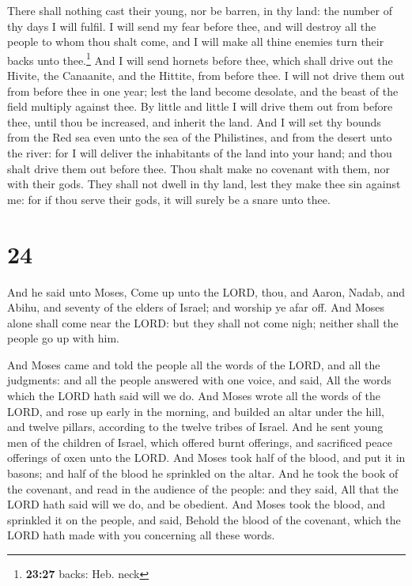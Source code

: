  There shall nothing cast their young, nor be barren, in
thy land: the number of thy days I will fulfil.  I will
send my fear before thee, and will destroy all the people to whom thou
shalt come, and I will make all thine enemies turn their backs unto
thee.\footnote{\textbf{23:27} backs: Heb. neck}  And I
will send hornets before thee, which shall drive out the Hivite, the
Canaanite, and the Hittite, from before thee.  I will not
drive them out from before thee in one year; lest the land become
desolate, and the beast of the field multiply against thee.
 By little and little I will drive them out from before
thee, until thou be increased, and inherit the land.  And
I will set thy bounds from the Red sea even unto the sea of the
Philistines, and from the desert unto the river: for I will deliver the
inhabitants of the land into your hand; and thou shalt drive them out
before thee.  Thou shalt make no covenant with them, nor
with their gods.  They shall not dwell in thy land, lest
they make thee sin against me: for if thou serve their gods, it will
surely be a snare unto thee.

\hypertarget{section-23}{%
\section{24}\label{section-23}}

 And he said unto Moses, Come up unto the LORD, thou, and
Aaron, Nadab, and Abihu, and seventy of the elders of Israel; and
worship ye afar off.  And Moses alone shall come near the
LORD: but they shall not come nigh; neither shall the people go up with
him.

 And Moses came and told the people all the words of the
LORD, and all the judgments: and all the people answered with one voice,
and said, All the words which the LORD hath said will we do.
 And Moses wrote all the words of the LORD, and rose up
early in the morning, and builded an altar under the hill, and twelve
pillars, according to the twelve tribes of Israel.  And he
sent young men of the children of Israel, which offered burnt offerings,
and sacrificed peace offerings of oxen unto the LORD.  And
Moses took half of the blood, and put it in basons; and half of the
blood he sprinkled on the altar.  And he took the book of
the covenant, and read in the audience of the people: and they said, All
that the LORD hath said will we do, and be obedient.  And
Moses took the blood, and sprinkled it on the people, and said, Behold
the blood of the covenant, which the LORD hath made with you concerning
all these words.

